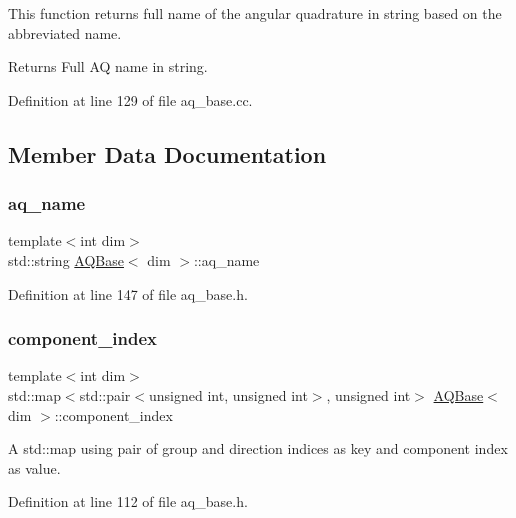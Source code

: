 This function returns full name of the angular quadrature in string based on the abbreviated name.

\begin{DoxyReturn}{Returns}
Full AQ name in string. 
\end{DoxyReturn}


Definition at line 129 of file aq\+\_\+base.\+cc.



\subsection{Member Data Documentation}
\mbox{\label{class_a_q_base_a3e50d2d59d1a4a2fabed3c4852f80c49}} 
\subsubsection{\texorpdfstring{aq\+\_\+name}{aq\_name}}
{\footnotesize\ttfamily template$<$int dim$>$ \\
std\+::string \hyperlink{class_a_q_base}{A\+Q\+Base}$<$ dim $>$\+::aq\+\_\+name\hspace{0.3cm}{\ttfamily [private]}}



Definition at line 147 of file aq\+\_\+base.\+h.

\mbox{\label{class_a_q_base_a0d9e9c6302e481718d62d76c09c83d2d}} 
\subsubsection{\texorpdfstring{component\+\_\+index}{component\_index}}
{\footnotesize\ttfamily template$<$int dim$>$ \\
std\+::map$<$std\+::pair$<$unsigned int, unsigned int$>$, unsigned int$>$ \hyperlink{class_a_q_base}{A\+Q\+Base}$<$ dim $>$\+::component\+\_\+index\hspace{0.3cm}{\ttfamily [protected]}}

A std\+::map using pair of group and direction indices as key and component index as value. 

Definition at line 112 of file aq\+\_\+base.\+h.

